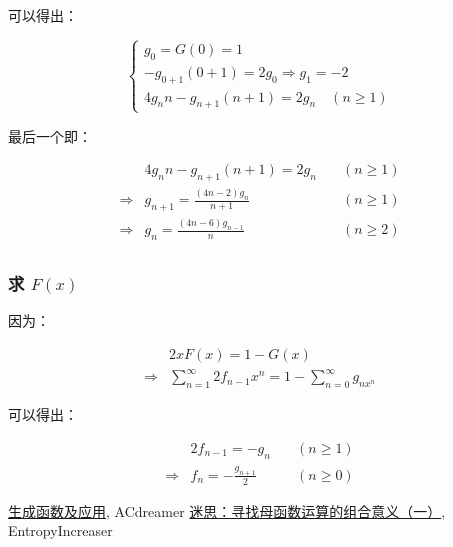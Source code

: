 \documentclass[UTF8]{article}
\begin{document}
可以得出：

$$
\begin{cases}
g_0=G(0)=1 \\
-g_{0+1}(0+1)=2g_0 \Rightarrow g_1=-2 \\
4g_{n}n-g_{n+1}(n+1)=2g_{n} \quad (n \ge 1)
\end{cases}
$$

最后一个即：

$$
\begin{aligned}
&4g_nn-g_{n+1}(n+1)=2g_n \quad & (n \ge 1) \\
\Rightarrow &g_{n+1}=\frac{(4n-2)g_n}{n+1} \quad & (n \ge 1) \\
\Rightarrow &g_{n}=\frac{(4n-6)g_{n-1}}{n} \quad & (n \ge 2) \\
\end{aligned}
$$

\subsubsection{求 $F(x)$}

因为：

$$
\begin{aligned}
&2xF(x)=1-G(x) \\
\Rightarrow & \sum_{n=1}^{\infty}2f_{n-1}x^n=1-\sum_{n=0}^{\infty} g_{nx^n}
\end{aligned}
$$

可以得出：

$$
\begin{aligned}
&2f_{n-1}=-g_{n} \quad & (n \ge 1) \\
\Rightarrow & f_{n}=-\frac{g_{n+1}}{2} \quad & (n \ge 0)
\end{aligned}
$$

\begin{thebibliography}{}
    \href{https://zhuanlan.zhihu.com/p/31457805}{生成函数及应用}, ACdreamer
    \href{https://zhuanlan.zhihu.com/p/54318231}{迷思：寻找母函数运算的组合意义（一）}, EntropyIncreaser
\end{thebibliography}
\end{document}
